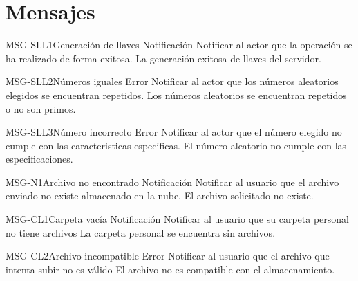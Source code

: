 \section{Mensajes}

\begin{Message}{MSG-SLL1}{Generación de llaves} 
	\MSGitem[Tipo: ] Notificación
	\MSGitem[Objetivo: ] Notificar al actor que la operación se ha realizado de forma exitosa.
	\MSGitem[Redacción: ] La generación exitosa de llaves del servidor.
	\MSGitem[Ejemplo: ] 
\end{Message}

\begin{Message}{MSG-SLL2}{Números iguales} 
	\MSGitem[Tipo: ] Error
	\MSGitem[Objetivo: ] Notificar al actor que los números aleatorios elegidos se encuentran repetidos.
	\MSGitem[Redacción: ] Los números aleatorios se encuentran repetidos o no son primos.
	\MSGitem[Ejemplo: ] 
\end{Message}

\begin{Message}{MSG-SLL3}{Número incorrecto} 
	\MSGitem[Tipo: ] Error
	\MSGitem[Objetivo: ] Notificar al actor que el número elegido no cumple con las caracteristicas especificas.
	\MSGitem[Redacción: ] El número aleatorio no cumple con las especificaciones.
	\MSGitem[Ejemplo: ] 
\end{Message}

\begin{Message}{MSG-N1}{Archivo no encontrado} 
	\MSGitem[Tipo: ] Notificación
	\MSGitem[Objetivo: ] Notificar al usuario que el archivo enviado no existe almacenado en la nube.
	\MSGitem[Redacción: ] El archivo solicitado no existe.
	\MSGitem[Ejemplo: ] 
\end{Message}

\begin{Message}{MSG-CL1}{Carpeta vacía} 
	\MSGitem[Tipo: ] Notificación
	\MSGitem[Objetivo: ] Notificar al usuario que su carpeta personal no tiene archivos
	\MSGitem[Redacción: ] La carpeta personal se encuentra sin archivos.
	\MSGitem[Ejemplo: ] 
\end{Message}

\begin{Message}{MSG-CL2}{Archivo incompatible} 
	\MSGitem[Tipo: ] Error
	\MSGitem[Objetivo: ] Notificar al usuario que el archivo que intenta subir no es válido
	\MSGitem[Redacción: ] El archivo no es compatible con el almacenamiento.
	\MSGitem[Ejemplo: ] 
\end{Message}

